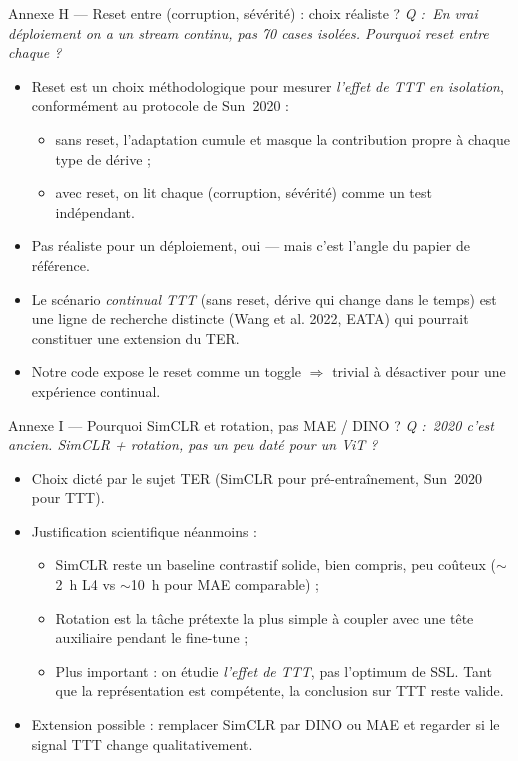 \documentclass[10pt,aspectratio=169]{beamer}
\newcommand{\qbox}[1]{\textit{\textcolor{accent}{Q : #1}}\par\smallskip}
\begin{document}
\begin{frame}{Annexe H --- Reset entre (corruption, sévérité) : choix réaliste ?}
  \qbox{\guillemotleft\,En vrai déploiement on a un \emph{stream} continu, pas 70 cases isolées. Pourquoi reset entre chaque ?\,\guillemotright{}}

  \begin{itemize}
    \item Reset est un choix \alert{méthodologique} pour mesurer \emph{l'effet de TTT en isolation}, conformément au protocole de Sun~2020 :
    \begin{itemize}\small
      \item sans reset, l'adaptation cumule et masque la contribution propre à chaque type de dérive ;
      \item avec reset, on lit chaque (corruption, sévérité) comme un test indépendant.
    \end{itemize}
    \item Pas réaliste pour un déploiement, oui --- mais c'est l'angle du papier de référence.
    \item Le scénario \emph{continual TTT} (sans reset, dérive qui change dans le temps) est une ligne de recherche distincte (Wang et al. 2022, EATA) qui pourrait constituer une extension du TER.
    \item Notre code expose le reset comme un toggle $\Rightarrow$ trivial à désactiver pour une expérience continual.
  \end{itemize}
\end{frame}

\begin{frame}{Annexe I --- Pourquoi SimCLR et rotation, pas MAE / DINO ?}
  \qbox{\guillemotleft\,2020 c'est ancien. SimCLR + rotation, pas un peu daté pour un ViT ?\,\guillemotright{}}

  \begin{itemize}
    \item Choix dicté par le sujet TER (SimCLR pour pré-entraînement, Sun~2020 pour TTT).
    \item Justification scientifique néanmoins :
    \begin{itemize}\small
      \item SimCLR reste un baseline contrastif solide, bien compris, peu coûteux ($\sim$2~h L4 vs $\sim$10~h pour MAE comparable) ;
      \item Rotation est la tâche prétexte la plus simple à coupler avec une tête auxiliaire pendant le fine-tune ;
      \item Plus important : on étudie \emph{l'effet de TTT}, pas l'optimum de SSL. Tant que la représentation est compétente, la conclusion sur TTT reste valide.
    \end{itemize}
    \item Extension possible : remplacer SimCLR par DINO ou MAE et regarder si le signal TTT change qualitativement.
  \end{itemize}
\end{frame}
\end{document}
